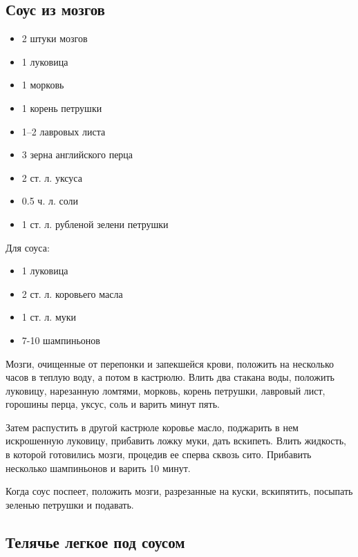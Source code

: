 \subsection{Соус из мозгов}

\begin{itemize}
	\item 2 штуки мозгов
    \item 1 луковица
    \item 1 морковь
    \item 1 корень петрушки
    \item 1–2 лавровых листа
    \item 3 зерна английского перца
    \item 2 ст. л. уксуса 
    \item 0.5 ч. л. соли
    \item 1 ст. л. рубленой зелени петрушки 
\end{itemize}
    
Для соуса: 

\begin{itemize}
	\item 1 луковица 
    \item 2 ст. л. коровьего масла
    \item 1 ст. л. муки 
    \item 7-10 шампиньонов
\end{itemize}

Мозги, очищенные от перепонки и запекшейся крови, положить на несколько часов в теплую воду, а потом в кастрюлю. Влить два стакана воды, положить луковицу, нарезанную ломтями, морковь, корень петрушки, лавровый лист, горошины перца, уксус, соль и варить минут пять.

Затем распустить в другой кастрюле коровье масло, поджарить в нем искрошенную луковицу, прибавить ложку муки, дать вскипеть. Влить жидкость, в которой готовились мозги, процедив ее сперва сквозь сито. Прибавить несколько шампиньонов и варить 10 минут.

Когда соус поспеет, положить мозги, разрезанные на куски, вскипятить, посыпать зеленью петрушки и подавать.

\subsection{Телячье легкое под соусом}


